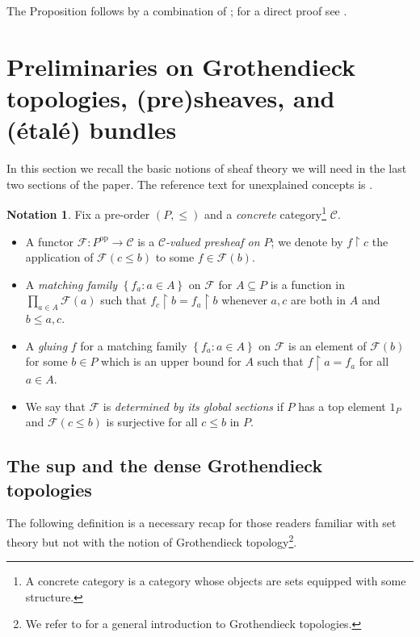 \documentclass[11pt]{amsart}
\newcommand{\F}{\mathcal{F}}
\theoremstyle{plain}
\theoremstyle{definition}
\newtheorem{notation}[theorem]{Notation}
\theoremstyle{plain}
\theoremstyle{remark}
\newcommand{\bp}[1]{\left\lbrace #1 \right\rbrace}
\newcommand{\0}{\mathsf{0}}
\renewcommand{\1}{\mathsf{1}}
\renewcommand{\2}{\mathsf{2}}
\theoremstyle{definition}
\begin{document}
 The Proposition follows by a combination of \cite[Proposition page 284 - Section 10.47, Theorem page 25 - Section 1.46]{RUSSSTCECOMP}; for a direct proof see \cite[Thm D.3.16]{viale-bookonforcing}.



\section{Preliminaries on Grothendieck topologies, (pre)sheaves, and (\'etal\'e) bundles}\label{sec:grothtoppreshetspbun}

In this section we recall the basic notions of sheaf theory we will need in the last two sections of the paper. The reference text for unexplained concepts is \cite{MacLMoer}.

\begin{notation}\label{not:globgrtop}
Fix a pre-order $(P,\leq)$ and a \emph{concrete} category\footnote{A concrete category is a category whose objects are sets equipped with some structure.}  $\mathcal{C}$.
\begin{itemize}
\item
A functor $\F:P^\mathrm{op}\to\mathcal{C}$ is a \emph{$\mathcal{C}$-valued presheaf on $P$}; we denote by $f\restriction c$ the application of 
$\F(c\leq b)$ to some $f\in \F(b)$.
\item
A \emph{matching family} $\bp{f_a:a\in A}$ on $\F$ for $A\subseteq P$ is a function in $\prod_{a\in A}\F(a)$
such that
$f_c\restriction b=f_a\restriction b$ whenever $a, c$ are both in $A$ and $b\leq a,c$.
\item
A \emph{gluing} $f$ for a matching family $\bp{f_a:a\in A}$ on $\F$  is an element of $\F(b)$ for some $b\in P$ which is an upper bound for $A$ such that $f\restriction a=f_a$ for all $a\in A$.
\item
We say that $\F$ is \emph{determined by its global sections} if $P$ has a top element $1_P$ and $\F(c\leq b)$ is surjective for all $c\leq b$ in $P$.
\end{itemize}
\end{notation}

\subsection{The sup and the dense Grothendieck topologies}
The following definition is a necessary recap for those readers familiar with set theory but not with the notion of Grothendieck topology\footnote{We refer to \cite[Chapters II and III]{MacLMoer} for a general introduction to Grothendieck topologies.}.
\end{document}

